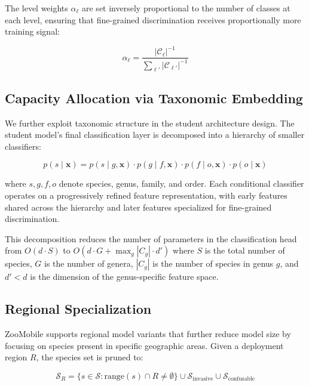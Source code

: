 The level weights $\alpha_\ell$ are set inversely proportional to the number of classes at each level, ensuring that fine-grained discrimination receives proportionally more training signal:

\begin{equation}
    \alpha_\ell = \frac{|\mathcal{C}_\ell|^{-1}}{\sum_{\ell'} |\mathcal{C}_{\ell'}|^{-1}}
\end{equation}

\subsection{Capacity Allocation via Taxonomic Embedding}

We further exploit taxonomic structure in the student architecture design.
The student model's final classification layer is decomposed into a hierarchy of smaller classifiers:

\begin{equation}
    p(s \mid \mathbf{x}) = p(s \mid g, \mathbf{x}) \cdot p(g \mid f, \mathbf{x}) \cdot p(f \mid o, \mathbf{x}) \cdot p(o \mid \mathbf{x})
\end{equation}

\noindent where $s, g, f, o$ denote species, genus, family, and order.
Each conditional classifier operates on a progressively refined feature representation, with early features shared across the hierarchy and later features specialized for fine-grained discrimination.

This decomposition reduces the number of parameters in the classification head from $O(d \cdot S)$ to $O(d \cdot G + \max_g |C_g| \cdot d')$ where $S$ is the total number of species, $G$ is the number of genera, $|C_g|$ is the number of species in genus $g$, and $d' < d$ is the dimension of the genus-specific feature space.

\subsection{Regional Specialization}

ZooMobile supports regional model variants that further reduce model size by focusing on species present in specific geographic areas.
Given a deployment region $R$, the species set is pruned to:

\begin{equation}
    \mathcal{S}_R = \{s \in \mathcal{S} : \text{range}(s) \cap R \neq \emptyset\} \cup \mathcal{S}_{\text{invasive}} \cup \mathcal{S}_{\text{confusable}}
\end{equation}

